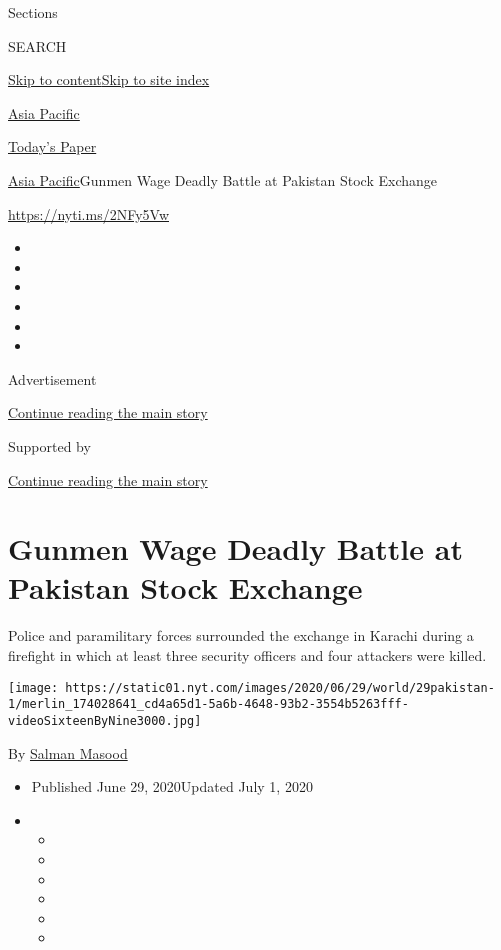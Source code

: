 Sections

SEARCH

\protect\hyperlink{site-content}{Skip to
content}\protect\hyperlink{site-index}{Skip to site index}

\href{https://www.nytimes.com/section/world/asia}{Asia Pacific}

\href{https://myaccount.nytimes.com/auth/login?response_type=cookie\&client_id=vi}{}

\href{https://www.nytimes.com/section/todayspaper}{Today's Paper}

\href{/section/world/asia}{Asia Pacific}\textbar{}Gunmen Wage Deadly
Battle at Pakistan Stock Exchange

\url{https://nyti.ms/2NFy5Vw}

\begin{itemize}
\item
\item
\item
\item
\item
\item
\end{itemize}

Advertisement

\protect\hyperlink{after-top}{Continue reading the main story}

Supported by

\protect\hyperlink{after-sponsor}{Continue reading the main story}

\hypertarget{gunmen-wage-deadly-battle-at-pakistan-stock-exchange}{%
\section{Gunmen Wage Deadly Battle at Pakistan Stock
Exchange}\label{gunmen-wage-deadly-battle-at-pakistan-stock-exchange}}

Police and paramilitary forces surrounded the exchange in Karachi during
a firefight in which at least three security officers and four attackers
were killed.

\texttt{[image: https://static01.nyt.com/images/2020/06/29/world/29pakistan-1/merlin\_174028641\_cd4a65d1-5a6b-4648-93b2-3554b5263fff-videoSixteenByNine3000.jpg]}

By \href{https://www.nytimes.com/by/salman-masood}{Salman Masood}

\begin{itemize}
\item
  Published June 29, 2020Updated July 1, 2020
\item
  \begin{itemize}
  \item
  \item
  \item
  \item
  \item
  \item
  \end{itemize}
\end{itemize}

